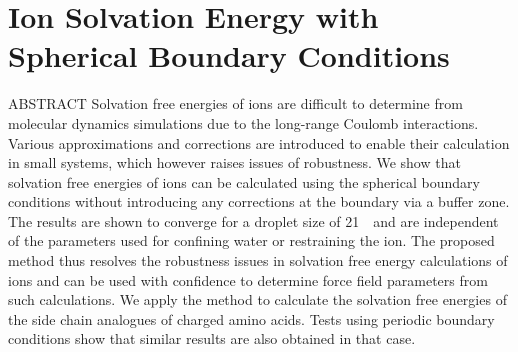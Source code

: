 \chapter{Ion Solvation Energy with Spherical Boundary Conditions}
\label{chap:ions}
ABSTRACT \newline
Solvation free energies of ions are difficult to determine from molecular 
dynamics simulations due to the long-range Coulomb interactions. Various 
approximations and corrections are introduced to enable their calculation in 
small systems, which however raises issues of robustness. We show that 
solvation free energies of ions can be calculated using the spherical boundary 
conditions without introducing any corrections at the boundary via a buffer 
zone. The results are shown to converge for a droplet size of 21~\angs\ and are 
independent of the parameters used for confining water or restraining the ion. 
The proposed method thus resolves the robustness issues in solvation free 
energy calculations of ions and can be used with confidence to determine
force field parameters from such calculations. We apply the method to calculate 
the solvation free energies of the side chain analogues of charged amino acids. 
Tests using periodic boundary conditions show that similar results are also 
obtained in that case. 

\newpage
